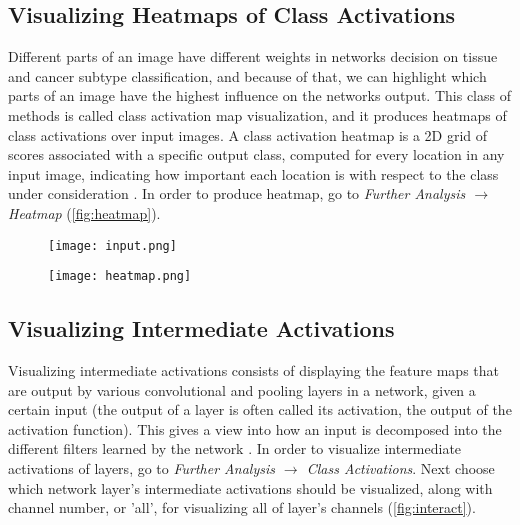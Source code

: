 \subsection{Visualizing Heatmaps of Class Activations}

Different parts of an image have different weights in networks decision on tissue and cancer subtype classification, and because of that, we can highlight which parts of an image have the highest influence on the networks output. This class of methods is called class activation map visualization, and it produces heatmaps of class activations over input images. A class activation heatmap is a 2D grid of scores associated with a specific output class, computed for every location in any input image, indicating how important each location is with respect to the class under consideration \cite{chollet2018deep}. In order to produce heatmap, go to \emph{Further Analysis $\rightarrow$ Heatmap} (\textcolor{red}{\autoref{fig:heatmap}}).

\begin{figure}[h]
	\centering
	\begin{minipage}{.5\textwidth}
		\centering
		\texttt{[image: input.png]}
		\label{fig:input}
	\end{minipage}%
	\begin{minipage}{.5\textwidth}
		\centering
		\texttt{[image: heatmap.png]}
		\label{fig:heatmap}
	\end{minipage}
\end{figure}

\subsection{Visualizing Intermediate Activations}

Visualizing intermediate activations consists of displaying the feature maps that are output by various convolutional and pooling layers in a network, given a certain input (the output of a layer is often called its activation, the output of the activation function). This gives a view into how an input is decomposed into the different filters learned by the network \cite{chollet2018deep}. In order to visualize intermediate activations of layers, go to \emph{Further Analysis $\rightarrow$ Class Activations}. Next choose which network layer's intermediate activations should be visualized, along with channel number, or 'all', for visualizing all of layer's channels  (\textcolor{red}{\autoref{fig:interact}}).


